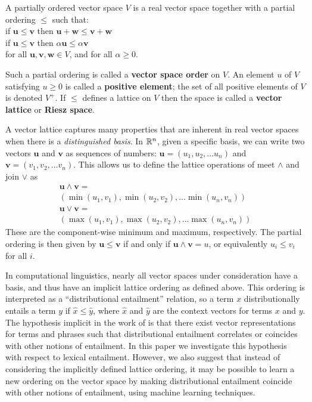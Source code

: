 \begin{definition}
  A partially ordered vector space $V$ is a real vector space together
  with a partial ordering $\le$ such that:\\[5pt]
  \indent if $\mathbf{u}\le\mathbf{v}$ then $\mathbf{u} + \mathbf{w} \le\mathbf{v} + \mathbf{w}$\\[5pt]
  \indent if $\mathbf{u} \le\mathbf{v}$ then $\alpha \mathbf{u} \le \alpha \mathbf{v}$
  \vspace{0.1cm}\\[5pt]
  for all $\mathbf{u},\mathbf{v},\mathbf{w} \in V$, and for all $\alpha \ge 0$. 
  
  Such a partial
  ordering is called a \textbf{vector space order} on $V$. An element
  $u$ of $V$ satisfying $u \ge 0$ is called a \textbf{positive
    element}; the set of all positive elements of $V$ is denoted
  $V^+$. If $\le$ defines a lattice on $V$ then the space is called a
  \textbf{vector lattice} or \textbf{Riesz space}.
\end{definition}

\begin{example}
  \label{example:finite}
  A vector lattice captures many properties that are inherent in real
  vector spaces when there is a \emph{distinguished basis}. In $\mathbb{R}^n$,
  given a specific basis, we can write two vectors $\mathbf{u}$ and $\mathbf{v}$ as
  sequences of numbers: $\mathbf{u} = (u_1,u_2,\ldots u_n)$ and $\mathbf{v} =
  (v_1,v_2,\ldots v_n)$. This allows us to define the lattice
  operations of meet $\land$ and join $\lor$ as
\[\begin{array}{l}
\mathbf{u}\land \mathbf{v} =\\
(\min(u_1,v_1),\min(u_2,v_2),\ldots \min(u_n,v_n))\\[5pt]
\mathbf{u}\lor \mathbf{v} = \\
(\max(u_1,v_1),\max(u_2,v_2),\ldots \max(u_n,v_n))
\end{array}\]
These are the component-wise minimum and maximum, respectively. The partial
ordering is then given by $\mathbf{u} \le\mathbf{v}$ if and only if $\mathbf{u} \land \mathbf{v} = u$, or
equivalently $u_i \le v_i$ for all $i$.
\end{example}

In computational linguistics, nearly all vector spaces under
consideration have a basis, and thus have an implicit lattice ordering
as defined above. This ordering is interpreted as a ``distributional
entailment'' relation, so a term $x$ distributionally entails a term
$y$ if $\hat{x} \le \hat{y}$, where $\hat{x}$ and $\hat{y}$ are the
context vectors for terms $x$ and $y$. The hypothesis implicit in the
work of  is that there exist vector representations
for terms and phrases such that distributional entailment correlates
or coincides with other notions of entailment. In this paper we
investigate this hypothesis with respect to lexical
entailment. However, we also suggest that instead of considering the
implicitly defined lattice ordering, it may be possible to learn a new
ordering on the vector space by making distributional entailment
coincide with other notions of entailment, using machine learning
techniques.

